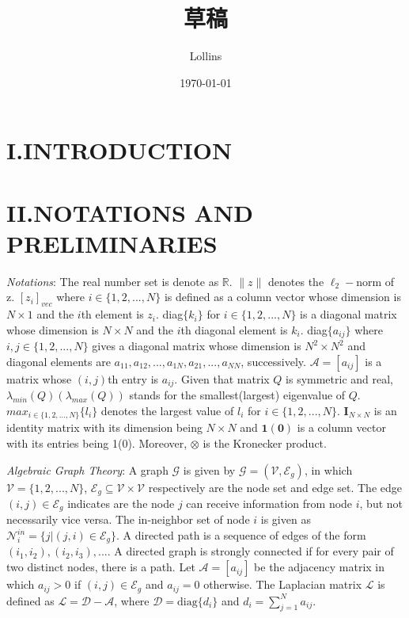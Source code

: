 \documentclass[12pt, a4paper, oneside]{ctexbook}
\title{{\Huge{\textbf{草稿}}}}
\author{Lollins}
\date{\today}
\begin{document}
\setcounter{page}{1}

\setcounter{page}{1}

\section*{I.\quad INTRODUCTION}
\section*{II.\quad NOTATIONS AND PRELIMINARIES}
\emph{Notations}: The real number set is denote as $\mathbb{R}$. $\|z\|$ denotes the $\ell_2-$norm of z. $[z_i]_{vec}$ where $i \in \{1,2,...,N\}$ is defined as a column vector whose dimension is $N \times 1$ and the $i$th element is $z_i$. diag$\{k_i\}$ for $i \in \{1,2,...,N\}$ is a diagonal matrix whose dimension is $N\times N$ and the $i$th diagonal element is $k_i$. diag$\{a_{ij}\}$ where $i,j \in \{1,2,...,N\}$ gives a diagonal matrix whose dimension is $N^2 \times N^2$ and diagonal elements are $a_{11},a_{12},...,a_{1N},a_{21},...,a_{NN}$, successively. $\mathcal{A} = [a_{ij}]$ is a matrix whose $(i,j)$th entry is $a_{ij}$. Given that matrix $Q$ is symmetric and real, $\lambda_{min}(Q)(\lambda_{max}(Q))$ stands for the smallest(largest) eigenvalue of $Q$. $max_{i \in \{1,2,...,N\}}\{l_i\}$ denotes the largest value of $l_i$ for $i \in \{1,2,...,N\}$. $\mathbf{I}_{N \times N}$ is an identity matrix with its dimension being $N \times N$ and $\mathbf{1}(\mathbf{0})$ is a column vector with its entries being 1(0). Moreover, $\otimes$ is the Kronecker product.

\emph{Algebraic Graph Theory}: A graph $\mathcal{G}$ is given by $\mathcal{G} = (\mathcal{V},\mathcal{E}_g)$, in which $\mathcal{V} = \{1,2,...,N\}$, $\mathcal{E}_g \subseteq \mathcal{V}\times\mathcal{V}$ respectively are the node set and edge set. The edge $(i,j) \in \mathcal{E}_g$ indicates are the node $j$ can receive information from node $i$, but not necessarily vice versa. The in-neighbor set of node $i$ is given as $\mathcal{N}_{i}^{in}=\{j|(j,i)\in\mathcal{E}_{g}\}$. A directed path is a sequence of edges of the form $(i_1,i_2), (i_2,i_3),....$ A directed graph is strongly connected if for every pair of two distinct nodes, there is a path. Let $\mathcal{A} = [a_{ij}]$ be the adjacency matrix in which $a_{ij} > 0$ if $(i,j) \in \mathcal{E}_g$ and $a_{ij} = 0$ otherwise. The Laplacian matrix $\mathcal{L}$ is defined as $\mathcal{L} = \mathcal{D} - \mathcal{A}$, where $\mathcal{D} = \text{diag}\{d_i\}$ and $d_i = \sum_{j=1}^{N}a_{ij}$.
\end{document}

